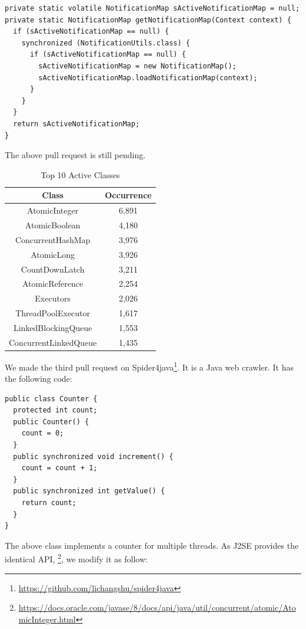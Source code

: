\begin{lstlisting}
private static volatile NotificationMap sActiveNotificationMap = null;
private static NotificationMap getNotificationMap(Context context) {
  if (sActiveNotificationMap == null) {
    synchronized (NotificationUtils.class) {
      if (sActiveNotificationMap == null) {
        sActiveNotificationMap = new NotificationMap();
        sActiveNotificationMap.loadNotificationMap(context);
      }
    }
  }
  return sActiveNotificationMap;
}
\end{lstlisting}

The above pull request is still pending.
\begin{table}
	\centering
	\caption{Top 10 Active Classes}\vspace*{-2ex}
	\label{table:topapi}
	\begin{tabular}{|c|c|}\hline
		Class&Occurrence\\\hline
		AtomicInteger&6,891\\
		AtomicBoolean&4,180\\
		ConcurrentHashMap&3,976\\
		AtomicLong&3,926\\
		CountDownLatch&3,211\\
		AtomicReference&2,254\\
		Executors&2,026\\
		ThreadPoolExecutor&1,617\\
		LinkedBlockingQueue&1,553\\
		ConcurrentLinkedQueue&1,435\\\hline
	\end{tabular}\vspace*{-3ex}
\end{table}

We made the third pull request on Spider4java\footnote{\url{https://github.com/lichangshu/spider4java}}. It is a Java web crawler. It has the following code:


\begin{lstlisting}
public class Counter {
  protected int count;
  public Counter() {
    count = 0;
  }
  public synchronized void increment() {
    count = count + 1;
  }
  public synchronized int getValue() {
    return count;
  }
}
\end{lstlisting}

The above class implements a counter for multiple threads. As J2SE provides the identical API, \footnote{\url{https://docs.oracle.com/javase/8/docs/api/java/util/concurrent/atomic/AtomicInteger.html}}, we modify it as follow:

